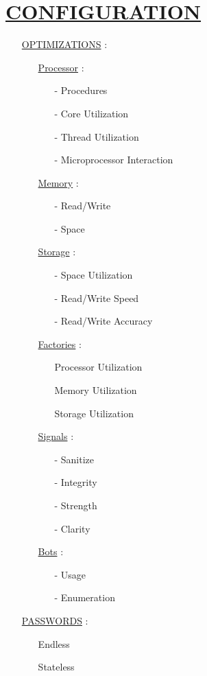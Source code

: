\documentclass[11pt]{article}
\begin{document}
\section*{\ul{CONFIGURATION}}
\begin{enumerate}
	
	\item[] \ul{OPTIMIZATIONS} :
	\begin{enumerate}
		\item[] \ul{Processor}  :
		\begin{enumerate}
			\item[-] Procedures
			\item[-] Core Utilization
			\item[-] Thread Utilization
			\item[-] Microprocessor Interaction
		\end{enumerate}
	
		\item[] \ul{Memory}  :
		\begin{enumerate}
			\item[-] Read/Write
			\item[-] Space
		\end{enumerate}
	
		\item[] \ul{Storage}  :
		\begin{enumerate}
			\item[-] Space Utilization
			\item[-] Read/Write Speed
			\item[-] Read/Write Accuracy
		\end{enumerate}
	
		\item[] \ul{Factories} :
		\begin{enumerate}
			\item[] Processor Utilization
			\item[] Memory Utilization
			\item[] Storage Utilization
		\end{enumerate}
	
		\item[] \ul{Signals} :
		\begin{enumerate}
			\item[-] Sanitize
			\item[-] Integrity
			\item[-] Strength
			\item[-] Clarity
		\end{enumerate}
			
		\item[] \ul{Bots}  :
		\begin{enumerate}
			\item[-] Usage
			\item[-] Enumeration
		\end{enumerate}
	\end{enumerate}

	\item[] \ul{PASSWORDS} :
	\begin{enumerate}
		\item[] Endless
		\item[] Stateless
	\end{enumerate}

\end{enumerate}
\end{document}
